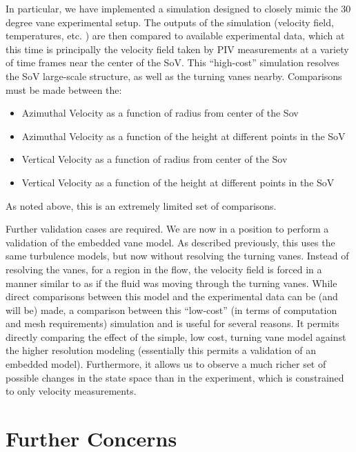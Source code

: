 In particular, we have implemented a simulation designed
to closely mimic the 30 degree vane experimental setup. The outputs of
the simulation (velocity field, temperatures, etc. ) are then compared
to available experimental data, which at this time is principally the
velocity field taken by PIV measurements at a variety of time frames
near the center of the SoV. This ``high-cost'' simulation resolves
the SoV large-scale structure, as well as the turning vanes
nearby. Comparisons must be made between the:
\begin{itemize}
 \item Azimuthal Velocity as a function of radius from center of the Sov
 \item Azimuthal Velocity as a function of the height at different
       points in the SoV
 \item Vertical Velocity as a function of radius from center of the Sov
 \item Vertical Velocity as a function of the height at different
       points in the SoV
\end{itemize}
As noted above, this is an extremely limited set of comparisons. 

%
%
Further validation cases are required. We are now in a position to perform
a validation of the embedded vane model. As described previously, this
uses the same turbulence models, but now without resolving the turning
vanes. Instead of resolving the vanes, for a region in the flow, the
velocity field is forced in a manner similar to as if the fluid was
moving through the turning vanes. While direct comparisons between this
model and the experimental data can be (and will be) made, a comparison between this
``low-cost'' (in terms of computation and mesh requirements) simulation
and is useful for several reasons. It permits directly comparing the effect of
the simple, low cost, turning vane model against the higher resolution
modeling (essentially this permits a validation of an embedded
model). Furthermore, it allows us to observe a much richer set of
possible changes in the state space than in the experiment, which is
constrained to only velocity measurements. 

%
%
\section{Further Concerns}

